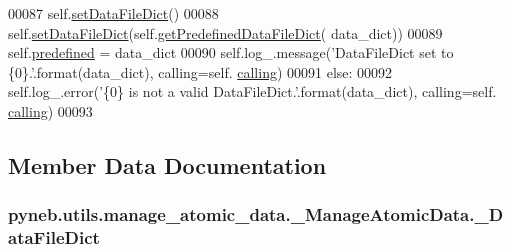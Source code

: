 \begin{DoxyCode}
00087             self.\hyperlink{classpyneb_1_1utils_1_1manage__atomic__data_1_1___manage_atomic_data_a196510345a35dc1749684b5619ce64d5}{setDataFileDict}()
00088             self.\hyperlink{classpyneb_1_1utils_1_1manage__atomic__data_1_1___manage_atomic_data_a196510345a35dc1749684b5619ce64d5}{setDataFileDict}(self.\hyperlink{classpyneb_1_1utils_1_1manage__atomic__data_1_1___manage_atomic_data_a95c5df20a27033c4c32831d85a1c2876}{getPredefinedDataFileDict}(
      data\_dict))
00089             self.\hyperlink{classpyneb_1_1utils_1_1manage__atomic__data_1_1___manage_atomic_data_a42d17444c105bd5238ae202a722ecb47}{predefined} = data\_dict
00090             self.log\_.message(\textcolor{stringliteral}{'DataFileDict set to \{0\}.'}.format(data\_dict), calling=self.
      \hyperlink{classpyneb_1_1utils_1_1manage__atomic__data_1_1___manage_atomic_data_ab10b91ca784741ce7af163d010802434}{calling})
00091         \textcolor{keywordflow}{else}:
00092             self.log\_.error(\textcolor{stringliteral}{'\{0\} is not a valid DataFileDict.'}.format(data\_dict), calling=self.
      \hyperlink{classpyneb_1_1utils_1_1manage__atomic__data_1_1___manage_atomic_data_ab10b91ca784741ce7af163d010802434}{calling})
00093  
            
\end{DoxyCode}


\subsection{Member Data Documentation}
\hypertarget{classpyneb_1_1utils_1_1manage__atomic__data_1_1___manage_atomic_data_a25a8e0770b6d8a375cfc9092d600684d}{
\subsubsection[{\-\_\-\-Data\-File\-Dict}]{\setlength{\rightskip}{0pt plus 5cm}pyneb.\-utils.\-manage\-\_\-atomic\-\_\-data.\-\_\-\-Manage\-Atomic\-Data.\-\_\-\-Data\-File\-Dict\hspace{0.3cm}{\ttfamily [private]}}}\label{classpyneb_1_1utils_1_1manage__atomic__data_1_1___manage_atomic_data_a25a8e0770b6d8a375cfc9092d600684d}


